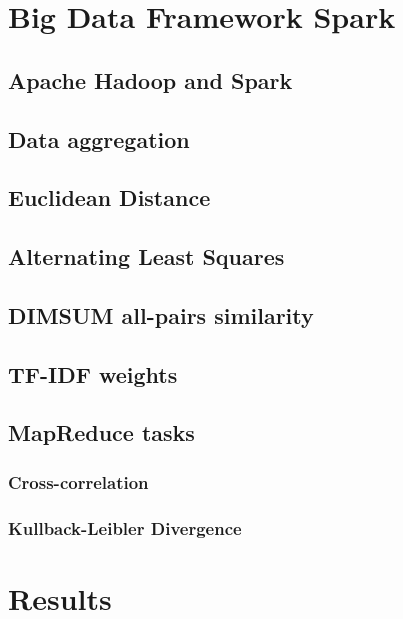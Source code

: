 
\chapter{Big Data Framework Spark}

\section{Apache Hadoop and Spark} 

\section{Data aggregation}

\section{Euclidean Distance}

\section{Alternating Least Squares}

\section{DIMSUM all-pairs similarity}

\section{TF-IDF weights}

\section{MapReduce tasks}
\subsection{Cross-correlation}

\subsection{Kullback-Leibler Divergence}



\chapter{Results}

